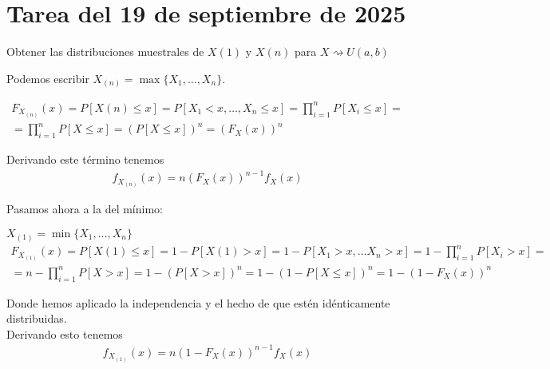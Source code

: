 \section{Tarea del 19 de septiembre de 2025}

\begin{ejercicio}
    
    Obtener las distribuciones muestrales de $X(1)$ y $X(n)$ para $X \rightsquigarrow U(a, b)$

    Podemos escribir $X_{(n)} = \max\{X_1,\dots,X_n\}$.

    \begin{gather*}
        F_{X_{(n)}} (x) = P[X(n)\leq x] = P[X_1<x,\dots,X_n\leq x] = \prod_{i=1}^n P[X_i\leq x] =\\ =\prod_{i=1}^n P[X\leq x] = (P[X\leq x])^n = (F_X(x))^n
    \end{gather*}

    Derivando este término tenemos
    \begin{gather*}
        f_{X_(n)}(x) = n(F_X(x))^{n-1}f_X(x)
    \end{gather*}

    Pasamos ahora a la del mínimo:

    $X_{(1)} = \min\{X_1,\dots,X_n\}$
    \begin{gather*}
        F_{X_{(1)}} (x) = P[X(1)\leq x] = 1- P[X(1)> x] = 1- P[X_1>x, \dots X_n>x] = 1 - \prod_{i=1}^n P[X_i>x] =\\= n-\prod_{i=1}^n P[X>x] = 1 - (P[X>x])^n = 1-(1-P[X\leq x])^n = 1 - (1-F_X(x))^n
    \end{gather*}

    Donde hemos aplicado la independencia y el hecho de que estén idénticamente distribuidas.\\

    Derivando esto tenemos
    \begin{gather*}
        f_{X_(1)}(x) = n(1-F_X(x))^{n-1}f_X(x)
    \end{gather*}
\end{ejercicio}
